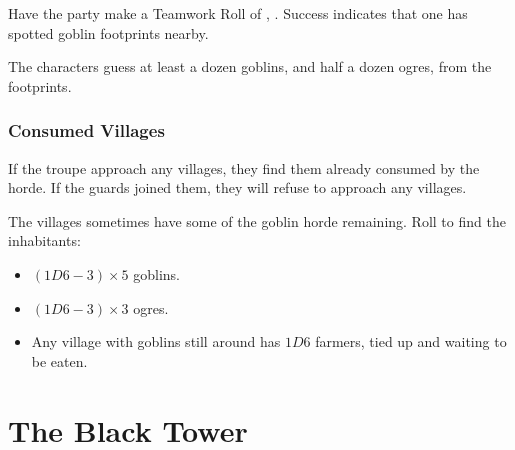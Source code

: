 \begin{multicols}{2}
\noindent
Have the party make a Teamwork Roll of , \tn[10].
Success indicates that one has spotted goblin footprints nearby.

The characters guess at least a dozen goblins, and half a dozen ogres, from the footprints.

\subsubsection{Consumed Villages}

If the troupe approach any villages, they find them already consumed by the horde.
If the \glspl{guard} joined them, they will refuse to approach any villages.

The villages sometimes have some of the goblin horde remaining.
Roll to find the inhabitants:

\begin{itemize}
  \item
  $(1D6 - 3)\times 5$ goblins.
  \item
  $(1D6 - 3)\times 3$ ogres.
  \item
  Any village with goblins still around has $1D6$ farmers, tied up and waiting to be eaten.
\end{itemize}

\end{multicols}

\section{The Black Tower}

